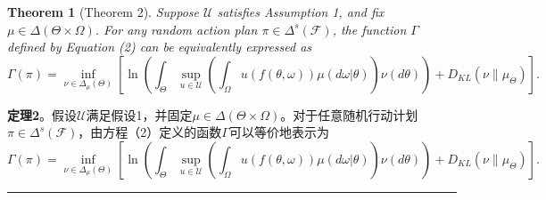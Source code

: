 \documentclass[12pt,a4paper]{article}
\newenvironment{translation}
  {\par\noindent\color{blue!70!black}\smallskip}
  {\par\medskip\hrule\medskip}
\newtheorem{theorem}{Theorem}[section]
\begin{document}
\begin{theorem}[Theorem 2]
Suppose $\mathcal{U}$ satisfies Assumption 1, and fix $\mu \in \Delta(\Theta \times \Omega)$. For any random action plan $\pi \in \Delta^s(\mathcal{F})$, the function $\Gamma$ defined by Equation (2) can be equivalently expressed as
\[
\Gamma(\pi) = \inf_{\nu \in \Delta_\mu(\Theta)} \left[ \ln\left( \int_\Theta \sup_{u \in \mathcal{U}} \left( \int_\Omega u(f(\theta, \omega)) \mu(d\omega|\theta) \right) \nu(d\theta) \right) + D_{KL}(\nu\|\mu_\Theta) \right].
\]
\end{theorem}
\begin{translation}
\textbf{定理2}。假设$\mathcal{U}$满足假设1，并固定$\mu \in \Delta(\Theta \times \Omega)$。对于任意随机行动计划$\pi \in \Delta^s(\mathcal{F})$，由方程（2）定义的函数$\Gamma$可以等价地表示为
\[
\Gamma(\pi) = \inf_{\nu \in \Delta_\mu(\Theta)} \left[ \ln\left( \int_\Theta \sup_{u \in \mathcal{U}} \left( \int_\Omega u(f(\theta, \omega)) \mu(d\omega|\theta) \right) \nu(d\theta) \right) + D_{KL}(\nu\|\mu_\Theta) \right].
\]
\end{translation}
\end{document}
